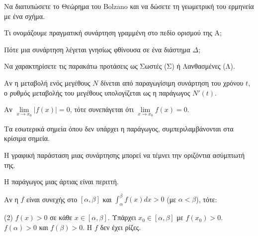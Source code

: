 \documentclass[11pt,a4paper]{article}
\newcommand{\kerkissans}[1]{{\fontfamily{maksf}\selectfont \textbf{#1}}}
\renewcommand{\textdexiakeraia}{}
\newcommand{\dint}{\displaystyle\int}
\newcommand\themanum{A}
\newcounter{thema}[section]
\renewcommand{\thethema}{\arabic{thema}}
\newcommand{\Thema}{\refstepcounter{thema}{\textbf{\textcolor{black}{\faPenSquare\ \  \large \kerkissans{\textbf{\thethemaο\hspace{2mm}Διαγώνισμα - Θέμα \themanum}}}}}\hspace{0mm}}{}
\newenvironment{thema}[1]
{\begin{tcolorbox}[title=\Thema\kerkissans{\textbf{\large{  #1}}},breakable,
enhanced standard,titlerule=0pt,toprule=0pt, rightrule=0pt, bottomrule=0pt,
colback=white,left=0mm,top=1mm,bottom=0mm,
boxrule=0pt,
colframe=white,leftrule=0mm,sharp corners,coltitle=black]
\renewcommand{\themanum}{#1}}
{\end{tcolorbox}}
\begin{document}
\begin{thema}{A}
\begin{erwthma}
    \item Να διατυπώσετε το Θεώρημα του Bolzano και να δώσετε τη γεωμετρική του ερμηνεία με ένα σχήμα.
    \item Τι ονομάζουμε πραγματική συνάρτηση γραμμένη στο πεδίο ορισμού της Α;
    \item Πότε μια συνάρτηση λέγεται γνησίως φθίνουσα σε ένα διάστημα $\Delta$;
    \item Να χαρακτηρίσετε τις παρακάτω προτάσεις ως Σωστές (Σ) ή Λανθασμένες (Λ).
    \begin{alist}
        \item Αν η μεταβολή ενός μεγέθους $N$ δίνεται από παραγωγίσιμη συνάρτηση του χρόνου $t$, ο ρυθμός μεταβολής του μεγέθους υπολογίζεται ως η παράγωγος $N'(t)$.
        \item Αν $\lim\limits_{x\to x_0} |f(x)| = 0$, τότε συνεπάγεται ότι $\lim\limits_{x\to x_0} f(x) = 0$.
        \item Τα εσωτερικά σημεία όπου δεν υπάρχει η παράγωγος, συμπεριλαμβάνονται στα κρίσιμα σημεία.
        \item Η γραφική παράσταση μιας συνάρτησης μπορεί να τέμνει την οριζόντια ασύμπτωτή της.
        \item Η παράγωγος μιας άρτιας είναι περιττή.
    \end{alist}
    \item Αν η $f$ είναι συνεχής στο $[\alpha, \beta]$ και $\dint_\alpha^\beta f(x)dx > 0$ (με $\alpha < \beta$), τότε:
    \begin{tasks}[label=\let\textdexiakeraia\relax\alph*.](2)
        \task $f(x) > 0$ σε κάθε $x \in [\alpha, \beta]$.
        \task Υπάρχει $x_0 \in [\alpha, \beta]$ με $f(x_0) > 0$.
        \task $f(\alpha) > 0$ και $f(\beta) > 0$.
        \task H $f$ δεν έχει ρίζες.
    \end{tasks}
\end{erwthma}
\end{thema}
\vspace{1cm}
\end{document}
